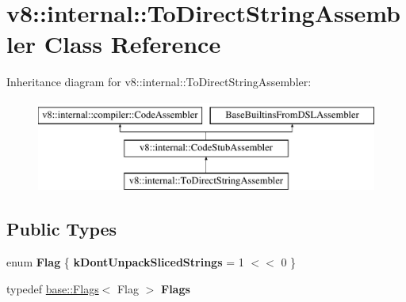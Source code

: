 \hypertarget{classv8_1_1internal_1_1ToDirectStringAssembler}{}\section{v8\+:\+:internal\+:\+:To\+Direct\+String\+Assembler Class Reference}
\label{classv8_1_1internal_1_1ToDirectStringAssembler}
Inheritance diagram for v8\+:\+:internal\+:\+:To\+Direct\+String\+Assembler\+:\begin{figure}[H]
\begin{center}
\leavevmode
\includegraphics[height=3.000000cm]{classv8_1_1internal_1_1ToDirectStringAssembler}
\end{center}
\end{figure}
\subsection*{Public Types}
\begin{DoxyCompactItemize}
\item 
\mbox{\label{classv8_1_1internal_1_1ToDirectStringAssembler_a79600ac382e10751e0f04ec585080405}} 
enum {\bfseries Flag} \{ {\bfseries k\+Dont\+Unpack\+Sliced\+Strings} = 1 $<$$<$ 0
 \}
\item 
\mbox{\label{classv8_1_1internal_1_1ToDirectStringAssembler_a115058277b54cf52d81bc630dc95c011}} 
typedef \mbox{\hyperlink{classv8_1_1base_1_1Flags}{base\+::\+Flags}}$<$ Flag $>$ {\bfseries Flags}
\end{DoxyCompactItemize}
